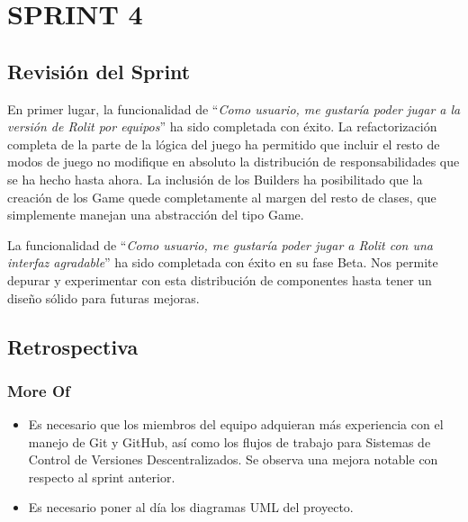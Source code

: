 \documentclass[../../SCRUM.tex]{subfiles}
\begin{document}
\section{SPRINT 4}
\subsection{Revisión del Sprint}
En primer lugar, la funcionalidad de ``\textit{Como usuario, me gustaría poder jugar a la versión de Rolit por equipos}'' ha sido completada con éxito. La refactorización completa de la parte de la lógica del juego ha permitido que incluir el resto de modos de juego no modifique en absoluto la distribución de responsabilidades que se ha hecho hasta ahora. La inclusión de los Builders ha posibilitado que la creación de los Game quede completamente al margen del resto de clases, que simplemente manejan una abstracción del tipo Game.

La funcionalidad de ``\textit{Como usuario, me gustaría poder jugar a Rolit con una interfaz agradable}'' ha sido completada con éxito en su fase Beta. Nos permite depurar y experimentar con esta distribución de componentes hasta tener un diseño sólido para futuras mejoras.

\subsection{Retrospectiva}
\subsubsection*{More Of}
\begin{itemize}
\item Es necesario que los miembros del equipo adquieran más experiencia con el manejo de Git y GitHub, así como los flujos de trabajo para Sistemas de Control de Versiones Descentralizados. Se observa una mejora notable con respecto al sprint anterior.

\item Es necesario poner al día los diagramas UML del proyecto.

\end{itemize}
\end{document}
